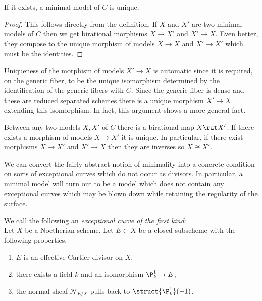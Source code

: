 \begin{lemma}
If it exists, a minimal model of $C$ is unique.
\end{lemma}

\begin{proof}
This follows directly from the definition. If $X$ and $X'$ are two minimal models of $C$ then we get birational morphisms $X \to X'$ and $X' \to X$. Even better, they compose to the unique morphism of models $X \to X$ and $X' \to X'$ which must be the identities.
\end{proof}

\begin{rmk}
Uniqueness of the morphism of models $X' \to X$ is automatic since it is required, on the generic fiber, to be the unique isomorphism determined by the identification of the generic fibers with $C$. Since the generic fiber is dense and these are reduced separated schemes there is a unique morphism $X' \to X$ extending this isomorphism. In fact, this argument shows a more general fact.
\end{rmk}

\begin{lemma} \label{existence_inverses}
Between any two models $X, X'$ of $C$ there is a birational map $X \rat X'$. If there exists a morphism of models $X \to X'$ it is unique. In particular, if there exist morphisms $X \to X'$ and $X' \to X$ then they are inverses so $X \cong X'$. 
\end{lemma}
\noindent
We can convert the fairly abstract notion of minimality into a concrete condition on sorts of exceptional curves which do not occur as divisors. In particular, a minimal model will turn out to be a model which does not contain any exceptional curves which may be blown down while retaining the regularity of the surface.

\begin{definition}
We call the following an \textit{exceptional curve of the first kind}:
\bigskip\\
Let $X$ be a Noetherian scheme. Let $E \subset X$ be a closed subscheme with the following properties,
\begin{enumerate}
\item $E$ is an effective Cartier divisor on $X$,
\item there exists a field $k$ and an isomorphism $\P^1_k \to E$,
\item the normal sheaf $\mathcal{N}_{E/X}$ pulls back to $\struct{\P^1_k}(-1)$. 
\end{enumerate}
\end{definition}

